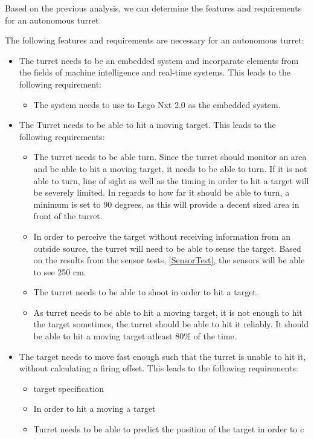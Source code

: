 Based on the previous analysis, we can determine the features and requirements
for an autonomous turret.

The following features and requirements are necessary for an autonomous turret:
\begin{itemize}
  \item The turret needs to be an embedded system and incorparate elements from
  the fields of machine intelligence and real-time systems. This leads to the
  following requirement:
  \begin{itemize}
    \item The system needs to use to Lego Nxt 2.0 as the embedded
    system.
  \end{itemize}
  \item The Turret needs to be able to hit a moving target. This leads to the
  following requirements:
  \begin{itemize}
    \item The turret needs to be able turn. Since the turret should monitor an
    area and be able to hit a moving target, it needs to be able to turn. If it
    is not able to turn, line of sight as well as the timing in order to hit a
    target will be severely limited. In regards to how far it should be able to
    turn, a minimum is set to 90 degrees, as this will provide a decent sized
    area in front of the turret.
    \item In order to perceive the target without receiving information from an
    outside source, the turret will need to be able to sense the target. Based
    on the results from the sensor tests, \autoref{SensorTest}, the sensors will
    be able to see 250 cm.    
    \item The turret needs to be able to shoot in order to hit a
    target.
    
    \item As turret needs to be able to hit a moving target, it is not enough
    to hit the target sometimes, the turret should be able to hit it reliably.
    It should be able to hit a moving target atleast 80\% of the time.
  \end{itemize}  
  \item The target needs to move fast enough such that the turret is unable to
  hit it, without calculating a firing offset. This leads to the following
  requirements:
  \begin{itemize}
    \item target specification
    \item In order to hit a moving a target
    \item Turret needs to be able to predict the position of the target in order
    to c
  \end{itemize}
  \end{itemize}
